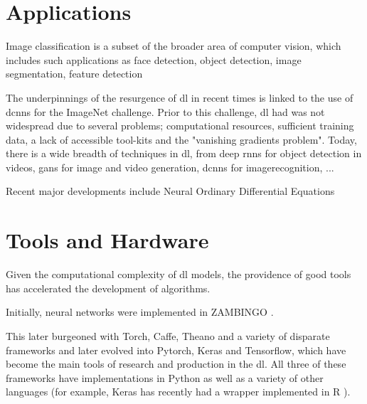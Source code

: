 
\section{Applications}

Image classification is a subset of the broader area of computer vision, which includes such applications as face detection, object detection, image segmentation, feature detection


The underpinnings of the resurgence of \gls{dl} in recent times is linked to the use of \gls{dcnn}s for the ImageNet challenge. Prior to this challenge, \gls{dl} had was not widespread due to several problems; computational resources, sufficient training data, a lack of accessible tool-kits and the "vanishing gradients problem". Today, there is a wide breadth of techniques in \gls{dl}, from deep \gls{rnn}s for object detection in videos, \gls{gan}s for image and video generation, \gls{dcnn}s for \gls{imagerecognition}, ... 

Recent major developments include Neural Ordinary Differential Equations

\section{Tools and Hardware}

Given the computational complexity of  \gls{dl} models, the providence of good tools has accelerated the development of algorithms. \bigskip

Initially, neural networks were implemented in ZAMBINGO . \bigskip

This later burgeoned with Torch, Caffe, Theano and a variety of disparate frameworks and later evolved into Pytorch, Keras and Tensorflow, which have become the main tools of research and production in the \gls{dl}. All three of these frameworks have implementations in Python as well as a variety of other languages (for example, Keras has recently had a wrapper implemented in R \cite{keras_r}).  \bigskip

